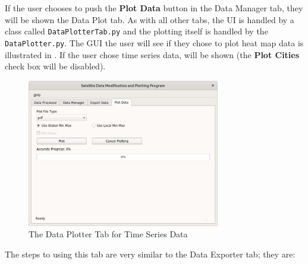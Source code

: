 \documentclass[../00_main.tex]{subfiles}
\begin{document}
If the user chooses to push the \textbf{Plot Data} button in the Data Manager
tab, they will be shown the Data Plot tab. As with all other tabs, the UI is
handled by a class called \texttt{DataPlotterTab.py} and the plotting itself is
handled by the \texttt{DataPlotter.py}. The GUI the user will see if they chose
to plot heat map data is illustrated in . If the user chose time
series data,  will be shown (the \textbf{Plot Cities} check box
will be disabled). 
\begin{figure}[H]
    \center
    \includegraphics[width=0.75\textwidth]{../graphics/dpl02}
    \caption{The Data Plotter Tab for Time Series Data}
    \label{dpl02}
\end{figure}
The steps to using this tab are very similar to the Data
Exporter tab; they are:
\end{document}
